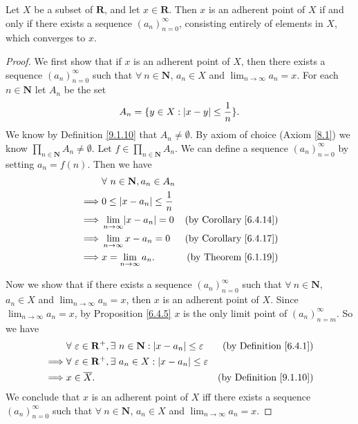 \begin{lemma}\label{9.1.14}
    Let \(X\) be a subset of \(\mathbf{R}\), and let \(x \in \mathbf{R}\).
    Then \(x\) is an adherent point of \(X\) if and only if there exists a sequence \((a_n)_{n = 0}^\infty\), consisting entirely of elements in \(X\), which converges to \(x\).
\end{lemma}

\begin{proof}
    We first show that if \(x\) is an adherent point of \(X\), then there exists a sequence \((a_n)_{n = 0}^\infty\) such that \(\forall\ n \in \mathbf{N}\), \(a_n \in X\) and \(\lim_{n \to \infty} a_n = x\).
    For each \(n \in \mathbf{N}\) let \(A_n\) be the set
    \[
        A_n = \{y \in X : \abs*{x - y} \leq \frac{1}{n}\}.
    \]
    We know by Definition \ref{9.1.10} that \(A_n \neq \emptyset\).
    By axiom of choice (Axiom \ref{8.1}) we know \(\prod_{n \in \mathbf{N}} A_n \neq \emptyset\).
    Let \(f \in \prod_{n \in \mathbf{N}} A_n\).
    We can define a sequence \((a_n)_{n = 0}^\infty\) by setting \(a_n = f(n)\).
    Then we have
    \begin{align*}
                 & \forall\ n \in \mathbf{N}, a_n \in A_n                                      \\
        \implies & 0 \leq \abs*{x - a_n} \leq \frac{1}{n}                                      \\
        \implies & \lim_{n \to \infty} \abs*{x - a_n} = 0 & \text{(by Corollary \ref{6.4.14})} \\
        \implies & \lim_{n \to \infty} x - a_n = 0        & \text{(by Corollary \ref{6.4.17})} \\
        \implies & x = \lim_{n \to \infty} a_n.           & \text{(by Theorem \ref{6.1.19})}
    \end{align*}

    Now we show that if there exists a sequence \((a_n)_{n = 0}^\infty\) such that \(\forall\ n \in \mathbf{N}\), \(a_n \in X\) and \(\lim_{n \to \infty} a_n = x\), then \(x\) is an adherent point of \(X\).
    Since \(\lim_{n \to \infty} a_n = x\), by Proposition \ref{6.4.5} \(x\) is the only limit point of \((a_n)_{n = m}^\infty\).
    So we have
    \begin{align*}
                 & \forall\ \varepsilon \in \mathbf{R}^+, \exists\ n \in \mathbf{N} : \abs*{x - a_n} \leq \varepsilon & \text{(by Definition \ref{6.4.1})}  \\
        \implies & \forall\ \varepsilon \in \mathbf{R}^+, \exists\ a_n \in X : \abs*{x - a_n} \leq \varepsilon                                              \\
        \implies & x \in \overline{X}.                                                                                & \text{(by Definition \ref{9.1.10})}
    \end{align*}
    We conclude that \(x\) is an adherent point of \(X\) iff there exists a sequence \((a_n)_{n = 0}^\infty\) such that \(\forall\ n \in \mathbf{N}\), \(a_n \in X\) and \(\lim_{n \to \infty} a_n = x\).
\end{proof}

